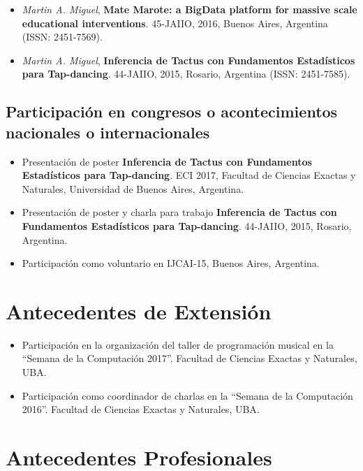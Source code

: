 \documentclass[a4paper,10pt]{article}
\begin{document}
\begin{itemize}
    \item 
\emph{Martin A. Miguel}, 
\textbf{Mate Marote: a BigData platform for massive scale educational
        interventions}.
        45-JAIIO, 2016, Buenos Aires, Argentina (ISSN: 2451-7569).
    \item 
\emph{Martin A. Miguel}, 
\textbf{Inferencia de Tactus con Fundamentos Estadísticos para Tap-dancing}.
        44-JAIIO, 2015, Rosario, Argentina (ISSN:  2451-7585).
\end{itemize}

\subsection{Participación en congresos o acontecimientos nacionales o
internacionales}

\begin{itemize}
    \item Presentación de poster 
\textbf{Inferencia de Tactus con Fundamentos Estadísticos para
Tap-dancing}.
    ECI 2017, Facultad de Ciencias Exactas y Naturales, Universidad de Buenos
        Aires, Argentina.
    \item Presentación de poster y charla para trabajo 
\textbf{Inferencia de Tactus con Fundamentos Estadísticos para
Tap-dancing}.
        44-JAIIO, 2015, Rosario, Argentina.
    \item Participación como voluntario en IJCAI-15, Buenos Aires, Argentina.
\end{itemize}

\section{Antecedentes de Extensión}

\begin{itemize}
    \item Participación en la organización del taller de programación musical
        en la “Semana de la Computación 2017”. Facultad de Ciencias Exactas y
        Naturales, UBA. 
    \item Participación como coordinador de charlas en la “Semana de la
        Computación 2016”. Facultad de Ciencias Exactas y Naturales, UBA. 
\end{itemize}

\section{Antecedentes Profesionales}
\end{document}

